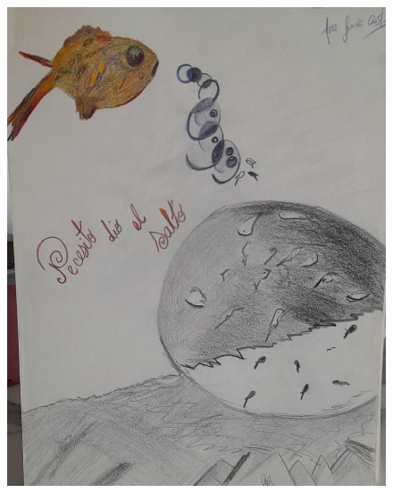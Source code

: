 \documentclass[12pt, a4paper, twoside]{book} %
\begin{document}
\begin{figure}[H]
	\centering
	\includegraphics[width=\textwidth]{./images/1f81324df1292e.jpg}
\end{figure}
\end{document}
